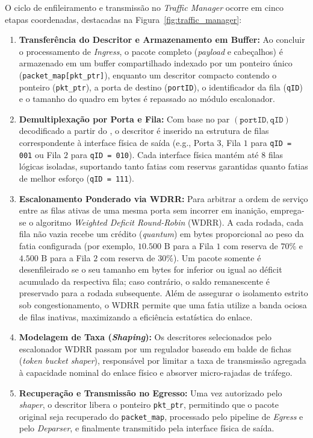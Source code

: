 O ciclo de enfileiramento e transmissão no \textit{Traffic Manager} ocorre em cinco etapas coordenadas, destacadas na Figura~\ref{fig:traffic_manager}:
\begin{enumerate}
    \item \textbf{Transferência do Descritor e Armazenamento em Buffer:} Ao concluir o processamento de \textit{Ingress}, o pacote completo (\textit{payload} e cabeçalhos) é armazenado em um buffer compartilhado indexado por um ponteiro único (\texttt{packet\_map[pkt\_ptr]}), enquanto um descritor compacto contendo o ponteiro (\texttt{pkt\_ptr}), a porta de destino (\texttt{portID}), o identificador da fila (\texttt{qID}) e o tamanho do quadro em bytes é repassado ao módulo escalonador.
    \item \textbf{Demultiplexação por Porta e Fila:} Com base no par $(\texttt{portID}, \texttt{qID})$ decodificado a partir do \routeID, o descritor é inserido na estrutura de filas correspondente à interface física de saída (e.g., Porta $3$, Fila $1$ para \texttt{qID = 001} ou Fila $2$ para \texttt{qID = 010}). Cada interface física mantém até $8$ filas lógicas isoladas, suportando tanto fatias com reservas garantidas quanto fatias de melhor esforço (\texttt{qID = 111}).
    \item \textbf{Escalonamento Ponderado via WDRR:} Para arbitrar a ordem de serviço entre as filas ativas de uma mesma porta sem incorrer em inanição, emprega-se o algoritmo \textit{Weighted Deficit Round-Robin} (WDRR). A cada rodada, cada fila não vazia recebe um crédito (\textit{quantum}) em bytes proporcional ao peso da fatia configurada (por exemplo, $10.500\text{ B}$ para a Fila $1$ com reserva de $70\%$ e $4.500\text{ B}$ para a Fila $2$ com reserva de $30\%$). Um pacote somente é desenfileirado se o seu tamanho em bytes for inferior ou igual ao déficit acumulado da respectiva fila; caso contrário, o saldo remanescente é preservado para a rodada subsequente. Além de assegurar o isolamento estrito sob congestionamento, o WDRR permite que uma fatia utilize a banda ociosa de filas inativas, maximizando a eficiência estatística do enlace.
    \item \textbf{Modelagem de Taxa (\textit{Shaping}):} Os descritores selecionados pelo escalonador WDRR passam por um regulador baseado em balde de fichas (\textit{token bucket shaper}), responsável por limitar a taxa de transmissão agregada à capacidade nominal do enlace físico e absorver micro-rajadas de tráfego.
    \item \textbf{Recuperação e Transmissão no Egresso:} Uma vez autorizado pelo \textit{shaper}, o descritor libera o ponteiro \texttt{pkt\_ptr}, permitindo que o pacote original seja recuperado do \texttt{packet\_map}, processado pelo pipeline de \textit{Egress} e pelo \textit{Deparser}, e finalmente transmitido pela interface física de saída.
\end{enumerate}

